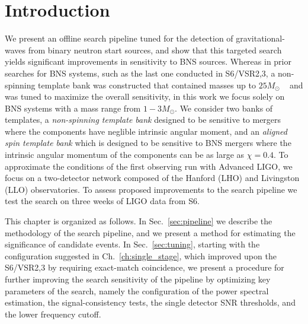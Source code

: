 


\section{Introduction}

We present an offline search pipeline tuned for the detection of gravitational-waves from binary neutron start sources, and show that this targeted search yields significant improvements in sensitivity to BNS sources. Whereas in prior searches for BNS systems, such as the last one conducted in S6/VSR2,3, a non-spinning template bank was constructed that contained masses up to $25M_\odot$ ~\cite{Abadie:2011nz} and was tuned to maximize the overall sensitivity, in this work we focus solely on BNS systems with a mass range from $1-3 M_\odot$. We consider two banks of templates, a \emph{non-spinning template bank} designed to be sensitive to mergers where the components have neglible intrinsic angular moment, and an \emph{aligned spin template bank} which is designed to be sensitive to BNS mergers where the intrinsic angular momentum of the components can be as large as $\chi=0.4$. To approximate the conditions of the first observing run with Advanced LIGO, we focus on a two-detector network composed of the Hanford (LHO) and Livingston (LLO) observatories. To assess proposed improvements to the search pipeline we test the search on three weeks of LIGO data from S6.

This chapter is organized as follows. In Sec.~\ref{sec:pipeline} we describe the methodology of the search pipeline, and we present a method for estimating the significance of candidate events. In Sec.~\ref{sec:tuning}, starting with the configuration suggested in Ch.~\ref{ch:single_stage}, which improved upon the S6/VSR2,3 by requiring exact-match coincidence, we present a procedure for further improving the search sensitivity of the pipeline by optimizing key parameters of the search, namely the configuration of the power spectral estimation, the signal-consistency tests, the single detector SNR thresholds, and the lower frequency cutoff. 

